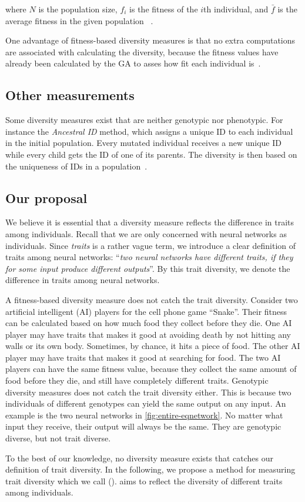 where $N$ is the population size, $f_i$ is the fitness of the $i$th individual, and $\bar{f}$ is the average fitness in the given population ~\cite{1250187}.

One advantage of fitness-based diversity measures is that no extra computations are associated with calculating the diversity, because the fitness values have already been calculated by the GA to asses how fit each individual is~\cite{Nguyen:2006:ASPGP}.

\subsection{Other measurements}
Some diversity measures exist that are neither genotypic nor phenotypic. For instance the \emph{Ancestral ID} method, which assigns a unique ID to each individual in the initial population.
Every mutated individual receives a new unique ID while every child gets the ID of one of its parents.
The diversity is then based on the uniqueness of IDs in a population~\cite{1250187}.

\subsection{Our proposal}
We believe it is essential that a diversity measure reflects the difference in traits among individuals.
Recall that we are only concerned with neural networks as individuals. 
Since \emph{traits} is a rather vague term, we introduce a clear definition of traits among neural networks: ``\emph{two neural networks have different traits, if they for some input produce different outputs}''. By this trait diversity, we denote the difference in traits among neural networks.

A fitness-based diversity measure does not catch the trait diversity. Consider two artificial intelligent (AI) players for the cell phone game ``Snake''. Their fitness can be calculated based on how much food they collect before they die. One AI player may have traits that makes it good at avoiding death by not hitting any walls or its own body. Sometimes, by chance, it hits a piece of food. The other AI player may have traits that makes it good at searching for food. The two AI players can have the same fitness value, because they collect the same amount of food before they die, and still have completely different traits.
Genotypic diversity measures does not catch the trait diversity either. This is because two individuals of different genotypes can yield the same output on any input. An example is the two neural networks in \cref{fig:entire-eqnetwork}. No matter what input they receive, their output will always be the same. They are genotypic diverse, but not trait diverse.

%

%

To the best of our knowledge, no diversity measure exists that catches our definition of trait diversity.
In the following, we propose a method for measuring trait diversity which we call \emph{\di{}} (\dia{}). 
\dia{} aims to reflect the diversity of different traits among individuals. 
